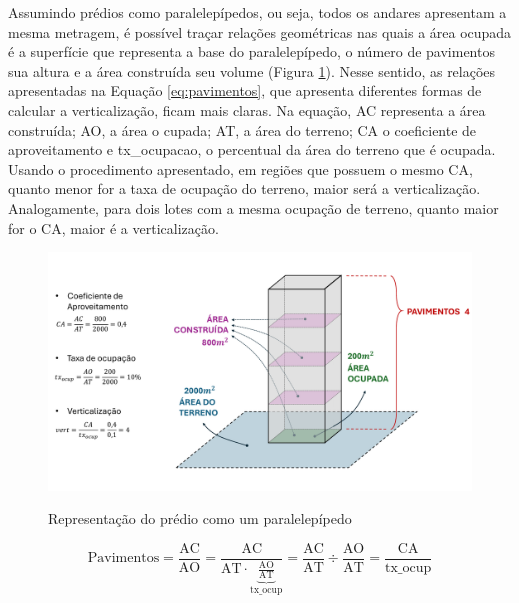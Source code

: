Assumindo prédios como paralelepípedos, ou seja, todos os andares apresentam a mesma metragem, é possível traçar relações geométricas nas quais a área ocupada é a superfície que representa a base do paralelepípedo, o número de pavimentos sua altura e a área construída seu volume (Figura \ref{fig:desenho}). Nesse sentido, as relações apresentadas na Equação \ref{eq:pavimentos}, que apresenta diferentes formas de calcular a verticalização, ficam mais claras. Na equação, AC representa a área construída; AO, a área o cupada; AT, a área do terreno; CA o coeficiente de aproveitamento e tx\_ocupacao, o percentual da área do terreno que é ocupada. Usando o procedimento apresentado, em regiões que possuem o mesmo CA, quanto menor for a taxa de ocupação do terreno, maior será a verticalização. Analogamente, para dois lotes com a mesma ocupação de terreno, quanto maior for o CA, maior é a verticalização.

\begin{figure}[h]
    \centering
    \caption{Representação do prédio como um paralelepípedo}
    \includegraphics[width = \linewidth]{imagens/desenho.pdf}
    \label{fig:desenho}
\end{figure}

\begin{equation}
    \text{Pavimentos}=\frac{\text{AC}}{\text{AO}}=\frac{\text{AC}}{\text{AT}\cdot\underbrace{\frac{\text{AO}}{\text{AT}}}_\text{tx\_ocup}}=\frac{\text{AC}}{\text{AT}}\div\frac{\text{AO}}{\text{AT}}=\frac{\text{CA}}{\text{tx\_ocup}}
    \label{eq:pavimentos}
\end{equation}


    



